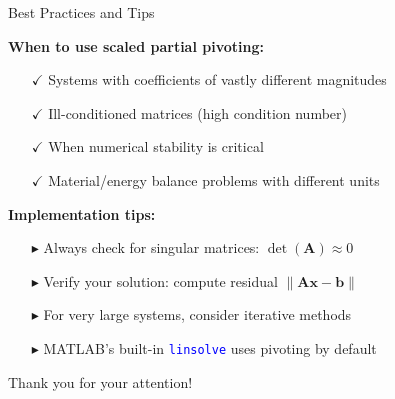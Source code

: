 \documentclass[aspectratio=169]{beamer}
\begin{document}
\begin{frame}[fragile]{Best Practices and Tips}
	\small{\alert{\textbf{When to use scaled partial pivoting:}}
		\begin{itemize}
			\item[$\checkmark$]
			      Systems with coefficients of vastly different magnitudes

			\item[$\checkmark$]
			      Ill-conditioned matrices (high condition number)

			\item[$\checkmark$]
			      When numerical stability is critical

			\item[$\checkmark$]
			      Material/energy balance problems with different units
		\end{itemize}

		\vspace{0.3cm}
		\alert{\textbf{Implementation tips:}}
		\begin{itemize}
			\item[$\blacktriangleright$]
			      Always check for singular matrices: $\det(\mathbf{A}) \approx 0$

			\item[$\blacktriangleright$]
			      Verify your solution: compute residual $\|\mathbf{Ax} - \mathbf{b}\|$

			\item[$\blacktriangleright$]
			      For very large systems, consider iterative methods

			\item[$\blacktriangleright$]
			      MATLAB's built-in \texttt{\textcolor{blue}{linsolve}} uses pivoting by default
		\end{itemize}}
\end{frame}

{
\begin{frame}[standout]
	Thank you for your attention!
\end{frame}
}
\end{document}
